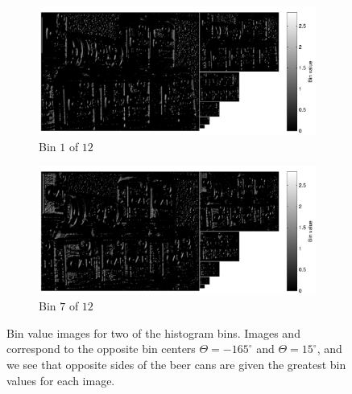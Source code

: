 \documentclass[thesis.tex]{subfiles}
\begin{document}
%
\begin{figure}[p]
	\centering
	\begin{subfigure}[t]{\textwidth}
		\includegraphics[width=\textwidth]{img/cellHistScaleSpacesBin01.pdf}
    	\caption{Bin $1$ of $12$}
    	\label{fig:cellHistScaleSpacesBin01}
	\end{subfigure}
	\begin{subfigure}[t]{\textwidth}
		\includegraphics[width=\textwidth]{img/cellHistScaleSpacesBin07.pdf}
    	\caption{Bin $7$ of $12$}
    	\label{fig:cellHistScaleSpacesBin07}
	\end{subfigure}
	\caption{Bin value images for two of the histogram bins. Images  and  correspond to the opposite bin centers $\Theta = -165^\circ$ and $\Theta = 15^\circ$, and we see that opposite sides of the beer cans are given the greatest bin values for each image.}
	\label{fig:cellHistScaleSpacesBins}
\end{figure}
%
%
%
%
\end{document}
